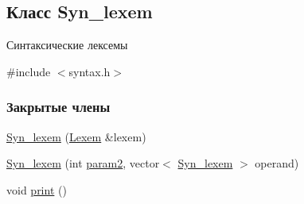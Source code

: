 \hypertarget{class_syn__lexem}{}\subsection{Класс Syn\+\_\+lexem}
\label{class_syn__lexem}


Синтаксические лексемы  




{\ttfamily \#include $<$syntax.\+h$>$}

\subsubsection*{Закрытые члены}
\begin{DoxyCompactItemize}
\item 
\hyperlink{class_syn__lexem_a41cbc6daa60c91a689593635f4ab7e68}{Syn\+\_\+lexem} (\hyperlink{class_lexem}{Lexem} \&lexem)
\item 
\hyperlink{class_syn__lexem_a4c905eacfd6896facc415ab1e66dd848}{Syn\+\_\+lexem} (int \hyperlink{class_syn__lexem_a05e633f5cc7073402b8324a28fba6c54}{param2}, vector$<$ \hyperlink{class_syn__lexem}{Syn\+\_\+lexem} $>$ operand)
\item 
void \hyperlink{class_syn__lexem_aeeae755d5f4283c36fd405fa1ba997d6}{print} ()
\end{DoxyCompactItemize}
